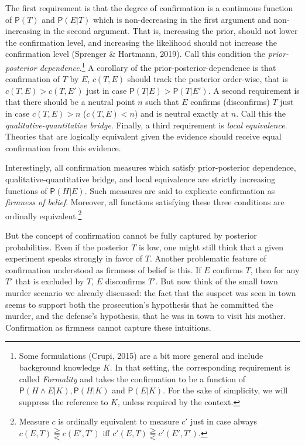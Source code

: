 \documentclass[
  10pt,
  dvipsnames,enabledeprecatedfontcommands]{scrartcl}
\newcommand{\et}{\wedge}
\newcommand{\pr}[1]{\mathsf{P}(#1)}
\begin{document}
The first requirement is that the degree of confirmation is a continuous
function of \(\pr{T}\) and \(\pr{E\vert T}\) which is non-decreasing in
the first argument and non-increasing in the second argument. That is,
increasing the prior, should not lower the confirmation level, and
increasing the likelihood should not increase the confirmation level
(Sprenger \& Hartmann, 2019). Call this condition the
\emph{prior-posterior dependence}.\footnote{Some formulations (Crupi,
  2015) are a bit more general and include background knowledge \(K\).
  In that setting, the corresponding requirement is called
  \emph{Formality} and takes the confirmation to be a function of
  \(\pr{H \et E \vert K}, \pr{H\vert K}\) and \(\pr{E\vert K}\). For the
  sake of simplicity, we will suppress the reference to \(K\), unless
  required by the context.} A corollary of the
prior-posterior-dependence is that confirmation of \(T\) by \(E\),
\(c(T,E)\) should track the posterior order-wise, that is
\(c(T,E)>c(T,E')\) just in case \(\pr{T\vert E} > \pr{T\vert E'}\). A
second requirement is that there should be a neutral point \(n\) such
that \(E\) confirms (disconfirms) \(T\) just in case \(c(T,E)>n\)
(\(c(T,E)<n\)) and is neutral exactly at \(n\). Call this the
\emph{qualitative-quantitative bridge}. Finally, a third requirement is
\emph{local equivalence}. Theories that are logically equivalent given
the evidence should receive equal confirmation from this evidence.

Interestingly, all confirmation measures which satisfy prior-posterior
dependence, qualitative-quantitative bridge, and local equivalence are
strictly increasing functions of \(\pr{H \vert E}\). Such measures are
said to explicate confirmation as \emph{firmness of belief}. Moreover,
all functions satisfying these three conditions are ordinally
equivalent.\footnote{Measure $c$ is ordinally equivalent to measure $c'$ just in case always $c(E , T) \gtreqqless c(E', T')$ iff $c'(E , T) \gtreqqless c'(E' , T')$.}

But the concept of confirmation cannot be fully captured by posterior
probabilities. Even if the posterior \(T\) is low, one might still think
that a given experiment speaks strongly in favor of \(T\). Another
problematic feature of confirmation understood as firmness of belief is
this. If \(E\) confirms \(T\), then for any \(T'\) that is excluded by
\(T\), \(E\) disconfirms \(T'\). But now think of the small town murder
scenario we already discussed: the fact that the suspect was seen in
town seems to support both the prosecution's hypothesis that he
committed the murder, and the defense's hypothesis, that he was in town
to visit his mother. Confirmation as firmness cannot capture these
intuitions.
\end{document}
